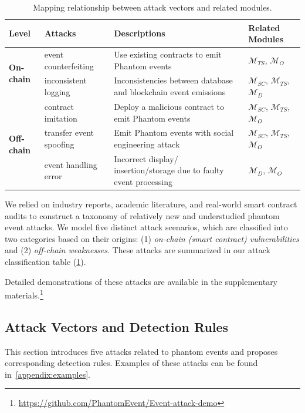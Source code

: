 \begin{table}[ht]
\centering
\caption{Mapping relationship between attack vectors and related modules.}
\label{tab:attack-classification}
\begin{tabular}{l|l|p{8.5cm}|p{3cm}}
\toprule
\textbf{Level} & \textbf{Attacks} & \textbf{Descriptions} & \textbf{Related Modules} \\
\midrule
\multirow{2}{*}{\textbf{On-chain}}
& event counterfeiting & Use existing contracts to emit Phantom events & \(\bm{\mathcal{M}}_{TS}\), \(\bm{\mathcal{M}}_{O}\) \\
\cmidrule{2-4}
& inconsistent logging & Inconsistencies between database and blockchain event emissions & \(\bm{\mathcal{M}}_{SC}\), \(\bm{\mathcal{M}}_{TS}\), \(\bm{\mathcal{M}}_{D}\) \\
\midrule
\multirow{3}{*}{\textbf{Off-chain}}
&contract imitation & Deploy a malicious contract to emit Phantom events & \(\bm{\mathcal{M}}_{SC}\), \(\bm{\mathcal{M}}_{TS}\), \(\bm{\mathcal{M}}_{O}\) \\
\cmidrule{2-4}
& transfer event spoofing & Emit Phantom events with social engineering attack & \(\bm{\mathcal{M}}_{SC}\), \(\bm{\mathcal{M}}_{TS}\), \(\bm{\mathcal{M}}_{O}\) \\
\cmidrule{2-4}
& event handling error & Incorrect display/ insertion/storage due to faulty event processing & \(\bm{\mathcal{M}}_{D}\), \(\bm{\mathcal{M}}_{O}\) \\
\bottomrule
\end{tabular}
\end{table}

We relied on industry reports, academic literature, and real-world smart contract audits to construct a taxonomy of relatively new and understudied phantom event attacks. We model five distinct attack
scenarios, which are classified into two categories based on their origins:
(1) \emph{on-chain (smart contract) vulnerabilities} and (2) \emph{off-chain weaknesses}.
These attacks are summarized in our attack classification table (\cref{tab:attack-classification}).

Detailed demonstrations of these attacks are available in the supplementary materials.\footnote{\url{https://github.com/PhantomEvent/Event-attack-demo}}


\subsection{Attack Vectors and Detection Rules}
This section introduces five attacks related to phantom events and proposes corresponding detection rules. Examples of these attacks can be found in~\cref{appendix:examples}.

